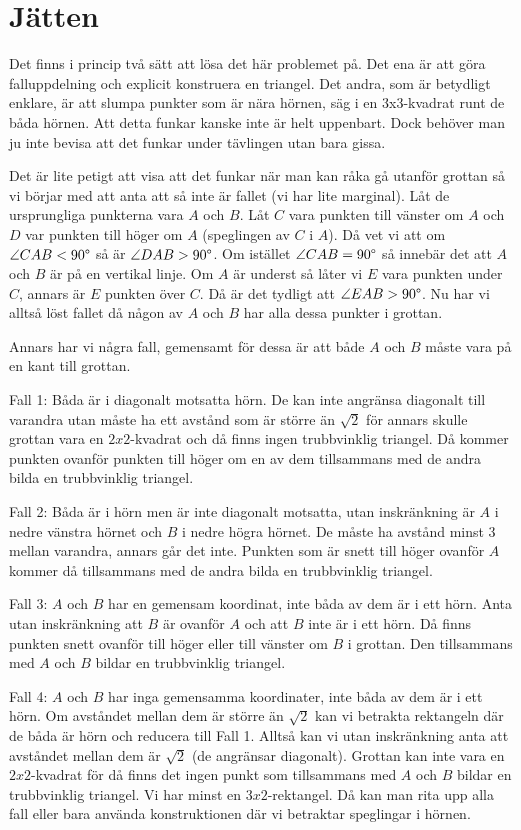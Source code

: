 \section{Jätten}
Det finns i princip två sätt att lösa det här problemet på. Det ena är att göra falluppdelning och explicit konstruera en triangel. 
Det andra, som är betydligt enklare, är att slumpa punkter som är nära hörnen, säg i en 3x3-kvadrat runt de båda hörnen. Att detta funkar kanske inte är helt uppenbart. Dock behöver man ju inte bevisa att det funkar under tävlingen utan bara gissa.

Det är lite petigt att visa att det funkar när man kan råka gå utanför grottan så vi börjar med att anta att så inte är fallet (vi har lite marginal). Låt de ursprungliga punkterna vara $A$ och $B$. Låt $C$ vara punkten till vänster om $A$ och $D$ var punkten till höger om $A$ (speglingen av $C$ i $A$). Då vet vi att om $\angle CAB < 90\degree$ så är $\angle DAB > 90\degree$. Om istället $\angle CAB = 90\degree$ så innebär det att $A$ och $B$ är på en vertikal linje. Om $A$ är underst så låter vi $E$ vara punkten under $C$, annars är $E$ punkten över $C$. Då är det tydligt att $\angle EAB > 90\degree$. Nu har vi alltså löst fallet då någon av $A$ och $B$ har alla dessa punkter i grottan.

Annars har vi några fall, gemensamt för dessa är att både $A$ och $B$ måste vara på en kant till grottan.

Fall 1: Båda är i diagonalt motsatta hörn. De kan inte angränsa diagonalt till varandra utan måste ha ett avstånd som är större än $\sqrt{2}$ för annars skulle grottan vara en $2x2$-kvadrat och då finns ingen trubbvinklig triangel. Då kommer punkten ovanför punkten till höger om en av dem tillsammans med de andra bilda en trubbvinklig triangel.

Fall 2: Båda är i hörn men är inte diagonalt motsatta, utan inskränkning är $A$ i nedre vänstra hörnet och $B$ i nedre högra hörnet. De måste ha avstånd minst $3$ mellan varandra, annars går det inte. Punkten som är snett till höger ovanför $A$ kommer då tillsammans med de andra bilda en trubbvinklig triangel.

Fall 3: $A$ och $B$ har en gemensam koordinat, inte båda av dem är i ett hörn. Anta utan inskränkning att $B$ är ovanför $A$ och att $B$ inte är i ett hörn. Då finns punkten snett ovanför till höger eller till vänster om $B$ i grottan. Den tillsammans med $A$ och $B$ bildar en trubbvinklig triangel.

Fall 4: $A$ och $B$ har inga gemensamma koordinater, inte båda av dem är i ett hörn. Om avståndet mellan dem är större än $\sqrt{2}$ kan vi betrakta rektangeln där de båda är hörn och reducera till Fall 1. Alltså kan vi utan inskränkning anta att avståndet mellan dem är $\sqrt{2}$ (de angränsar diagonalt). Grottan kan inte vara en $2x2$-kvadrat för då finns det ingen punkt som tillsammans med $A$ och $B$ bildar en trubbvinklig triangel. Vi har minst en $3x2$-rektangel. Då kan man rita upp alla fall eller bara använda konstruktionen där vi betraktar speglingar i hörnen.

